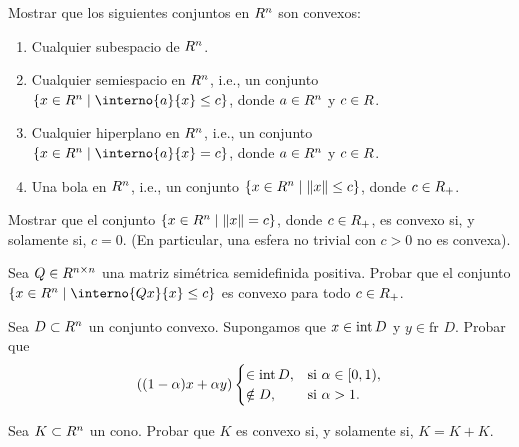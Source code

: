 


\begin{exercise}\label{v1:ejer:3.1.1}
 Mostrar que los siguientes conjuntos en $R^n$ son convexos:
 \begin{enumerate}[label=(\alph*)]
  \item Cualquier subespacio de $R^n$.
  \item Cualquier semiespacio en $R^n$, i.e., un conjunto $\{ x \in \Rn \mid \interno{a}{x} \le c \}$, donde $a \in R^n$ y $c \in R$.
  \item Cualquier hiperplano en $R^n$, i.e., un conjunto $\{ x \in \Rn \mid \interno{a}{x} = c \}$, donde $a \in R^n$ y $c \in R$.
  \item Una bola en $R^n$, i.e., un conjunto $\{ x \in R^n \mid \lVert x\rVert \le c \}$, donde $c \in R_+$.
 \end{enumerate}
\end{exercise}

\begin{exercise}\label{v1:ejer:3.1.2}
 Mostrar que el conjunto $\{ x \in R^n \mid \lVert x\rVert = c \}$, donde $c \in R_+$, es convexo si, y solamente si, $c = 0$.
 (En particular, una esfera no trivial con $c > 0$ no es convexa).
\end{exercise}

\begin{exercise}\label{v1:ejer:3.1.3}
 Sea $Q \in R^{n \times n}$ una matriz simétrica semidefinida positiva. Probar que el conjunto $\{ x \in \Rn \mid \interno{Qx}{x} \le c \}$ es convexo para todo $c \in R_+$.
\end{exercise}

\begin{exercise}\label{v1:ejer:3.1.4}
 Sea $D \subset R^n$ un conjunto convexo. Supongamos que $x \in \operatorname{\operatorname{int}} D$ y $y \in \text{fr } D$. Probar que
 \[
 ((1 - \alpha)x + \alpha y) \begin{cases} \in \operatorname{\operatorname{int}} D, & \text{si } \alpha \in [0, 1), \\ \notin D, & \text{si } \alpha > 1. \end{cases}
 \]
\end{exercise}

\begin{exercise}\label{v1:ejer:3.1.5}
 Sea $K \subset R^n$ un cono. Probar que $K$ es convexo si, y solamente si, $K = K + K$.
\end{exercise}

